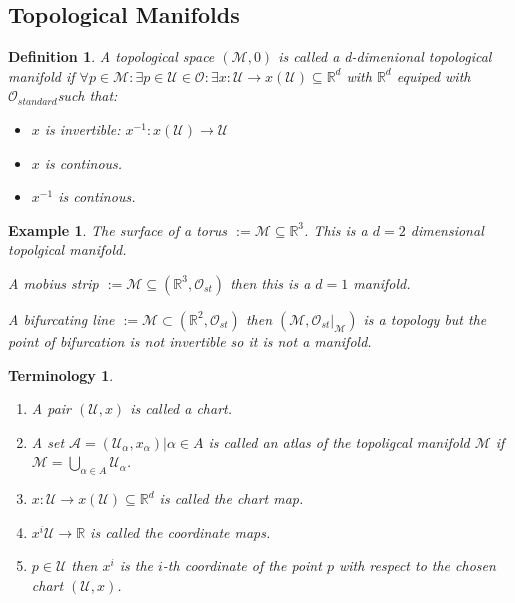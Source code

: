 \documentclass[10pt, oneside]{article}
\newcommand{\R}{\mathbb{R}}
\newcommand{\M}{\mathcal{M}}
\newtheorem{defn}{Definition}
\newtheorem{example}{Example}
\newtheorem{Terminology}{Terminology}
\begin{document}
      \subsection*{Topological Manifolds}
         \begin{defn}
            A topological space $(\M, \mathcal{0})$ is called a d-dimenional topological manifold if $\forall p \in \M: \exists p \in \mathcal{U} \in \mathcal{O} : \exists x:\mathcal{U} \to x(\mathcal{U}) \subseteq \R^d$ with $\R^d$ equiped with $\mathcal{O}_{standard}$such that:
            \begin{itemize}
               \item $x$ is invertible: $x^{-1}: x(\mathcal{U}) \to \mathcal{U}$
               \item $x$ is continous. 
               \item $x^{-1}$ is continous.
            \end{itemize}
         \end{defn}
         \begin{example}
            \item The surface of a torus $:= \M \subseteq \R^3$. This is a $d=2$ dimensional topolgical manifold. 
            \item A mobius strip $:= \M \subseteq (\R^3,\mathcal{O}_{st})$ then this is a $d=1$ manifold. 
            \item A bifurcating line $:= \M \subset (\R^2,\mathcal{O}_{st})$ then $(\M, \mathcal{O}_{st}|_{\M})$ is a topology but the point of bifurcation is not invertible so it is not a manifold. 
         \end{example}
         \begin{Terminology}
            \begin{enumerate}
               \item A pair $(\mathcal{U},x)$ is called a chart. 
               \item A set $\mathcal{A}={(\mathcal{U_\alpha},x_{\alpha})|\alpha \in A}$ is called an atlas of the topoligcal manifold $\M$ if $\mathcal{M} = \bigcup_{\alpha \in A} \mathcal{U}_\alpha$.
               \item $x:\mathcal{U} \to x(\mathcal{U}) \subseteq \R^d$ is called the chart map. 
               \item $x^{i} \mathcal{U} \to \R$ is called the coordinate maps. 
               \item $p \in \mathcal{U}$ then $x^{i}$ is the $i$-th coordinate of the point $p$ with respect to the chosen chart $(\mathcal{U},x)$.
            \end{enumerate}
         \end{Terminology}
\end{document}
